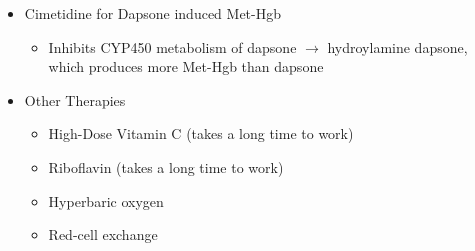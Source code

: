 \documentclass[main.tex]{subfiles}
\begin{document}
\begin{itemize}[noitemsep]
	\item Cimetidine for Dapsone induced Met-Hgb
	\begin{itemize}[noitemsep]
		\item Inhibits CYP450 metabolism of dapsone $\to$ hydroylamine dapsone, which produces more Met-Hgb than dapsone
	\end{itemize}
	
	\item Other Therapies
	\begin{itemize}[noitemsep]
		\item High-Dose Vitamin C (takes a long time to work)
		\item Riboflavin (takes a long time to work)
		\item Hyperbaric oxygen
		\item Red-cell exchange
	\end{itemize}
\end{itemize}

\nocite{goldfrankGoldfrankManualToxicologic2007,ludlowMethemoglobinemia2019,prasadDapsoneInducedMethemoglobinemia2008,shihanaSimpleQuantitativeBedside2010,skoldMethemoglobinemiaPathogenesisDiagnosis2011}

\printmybib
	
\end{document}

